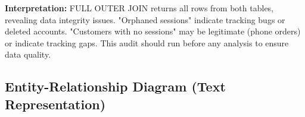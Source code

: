 \documentclass[12pt,a4paper]{article}
\begin{document}
\begin{resultbox}
\textbf{Interpretation:} FULL OUTER JOIN returns all rows from both tables, revealing
data integrity issues. "Orphaned sessions" indicate tracking bugs or deleted accounts.
"Customers with no sessions" may be legitimate (phone orders) or indicate tracking gaps.
This audit should run before any analysis to ensure data quality.
\end{resultbox}




\subsection*{Entity-Relationship Diagram (Text Representation)}
\end{document}
